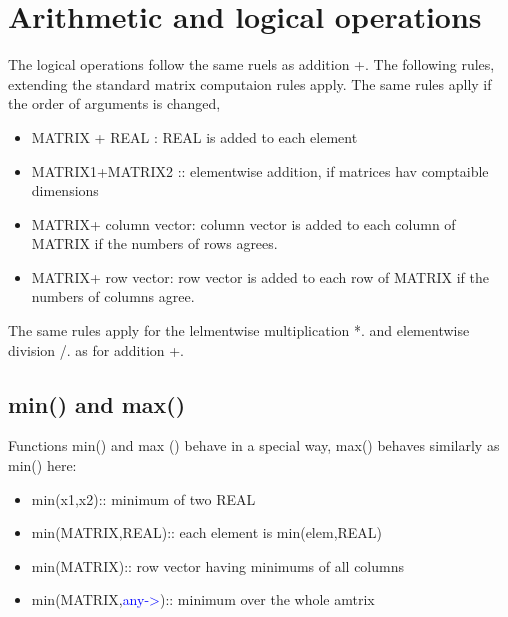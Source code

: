 \section{Arithmetic and logical operations}
\label{arit}
The logical operations follow the same ruels as addition +. The following rules,
extending the standard matrix computaion rules apply. The same rules aplly if the
order of arguments is changed,
\begin{itemize}
\item MATRIX + REAL : REAL is added to each element

\item MATRIX1+MATRIX2 :: elementwise addition, if matrices hav comptaible dimensions
\item  MATRIX+ column vector: column vector is added to each column of MATRIX
if the numbers of rows agrees.
\item  MATRIX+ row vector: row vector is added to each
row of MATRIX
if the numbers of columns agree.

\end{itemize}
The same rules apply for the lelmentwise multiplication *. and elementwise
division /. as for addition +.
\subsection{\textcolor{VioletRed}{min}() and \textcolor{VioletRed}{max}()}
\label{minmax}
Functions \textcolor{VioletRed}{min}() and max ()
behave in a special way, \textcolor{VioletRed}{max}() behaves similarly as \textcolor{VioletRed}{min}() here:
\begin{itemize}
\item \textcolor{VioletRed}{min}(x1,x2):: minimum of two REAL
\item \textcolor{VioletRed}{min}(MATRIX,REAL):: each element is \textcolor{VioletRed}{min}(elem,REAL)
\item \textcolor{VioletRed}{min}(MATRIX):: row vector having minimums of all columns
\item \textcolor{VioletRed}{min}(MATRIX,\textcolor{blue}{any->}):: minimum over the whole amtrix
\end{itemize}
